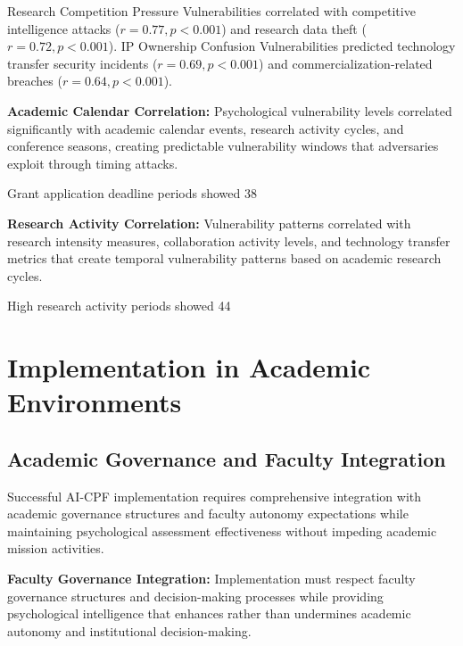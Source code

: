 \documentclass[10pt, twocolumn]{article}
\begin{document}
Research Competition Pressure Vulnerabilities correlated with competitive intelligence attacks ($r = 0.77, p < 0.001$) and research data theft ($r = 0.72, p < 0.001$). IP Ownership Confusion Vulnerabilities predicted technology transfer security incidents ($r = 0.69, p < 0.001$) and commercialization-related breaches ($r = 0.64, p < 0.001$).

\textbf{Academic Calendar Correlation:} Psychological vulnerability levels correlated significantly with academic calendar events, research activity cycles, and conference seasons, creating predictable vulnerability windows that adversaries exploit through timing attacks.

Grant application deadline periods showed 38%

\textbf{Research Activity Correlation:} Vulnerability patterns correlated with research intensity measures, collaboration activity levels, and technology transfer metrics that create temporal vulnerability patterns based on academic research cycles.

High research activity periods showed 44%

\section{Implementation in Academic Environments}

\subsection{Academic Governance and Faculty Integration}

Successful AI-CPF implementation requires comprehensive integration with academic governance structures and faculty autonomy expectations while maintaining psychological assessment effectiveness without impeding academic mission activities.

\textbf{Faculty Governance Integration:} Implementation must respect faculty governance structures and decision-making processes while providing psychological intelligence that enhances rather than undermines academic autonomy and institutional decision-making.
\end{document}
